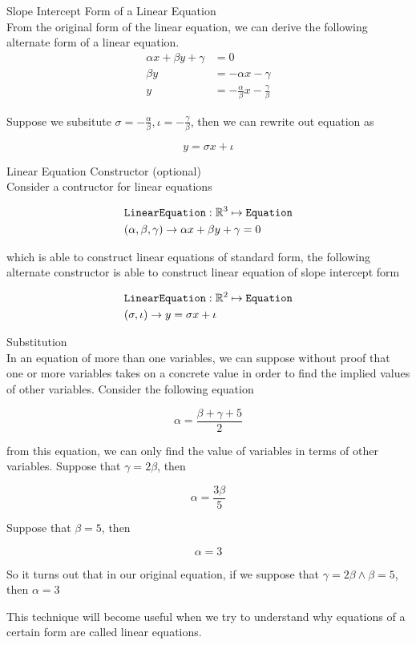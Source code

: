 \documentclass{book}
\begin{document}
  {\remark Slope Intercept Form of a Linear Equation \\
    From the original form of the linear equation, we can derive the following alternate form of a linear equation.
    \begin{align*}
      \alpha x + \beta y + \gamma & = 0\\
      \beta y & = - \alpha x - \gamma\\
      y & = -\frac{\alpha}{\beta} x - \frac{\gamma}{\beta}
    \end{align*}

    Suppose we subsitute $\sigma = - \frac{\alpha}{\beta}, \iota = - \frac{\gamma}{\beta}$, then we can rewrite out equation as

    $$y = \sigma x + \iota$$
  }

  {\remark Linear Equation Constructor (optional) \\
    Consider a contructor for linear equations

    \begin{align*}
      & \text{\texttt{LinearEquation}}: \mathbb{R}^3 \mapsto \text{\texttt{Equation}}\\
      & (\alpha, \beta, \gamma) \to \alpha x + \beta y + \gamma = 0
    \end{align*}

    which is able to construct linear equations of standard form, the following alternate constructor is able to construct linear equation of slope intercept form

    \begin{align*}
      & \text{\texttt{LinearEquation}}: \mathbb{R}^2 \mapsto \text{\texttt{Equation}}\\
      & (\sigma, \iota) \to y = \sigma x + \iota
    \end{align*}
  }

  {\remark Substitution \\

    In an equation of more than one variables, we can suppose without proof that one or more variables takes on a concrete value in order to find the implied values of other variables. Consider the following equation

    $$\alpha = \frac{\beta + \gamma + 5}{2}$$

    from this equation, we can only find the value of variables in terms of other variables. Suppose that $\gamma = 2\beta$, then

    $$\alpha = \frac{3\beta}{5}$$

    Suppose that $\beta = 5$, then

    $$\alpha = 3$$

    So it turns out that in our original equation, if we suppose that $\gamma = 2\beta \land \beta = 5$, then $\alpha = 3$

    This technique will become useful when we try to understand why equations of a certain form are called linear equations.\\
  }
\end{document}
